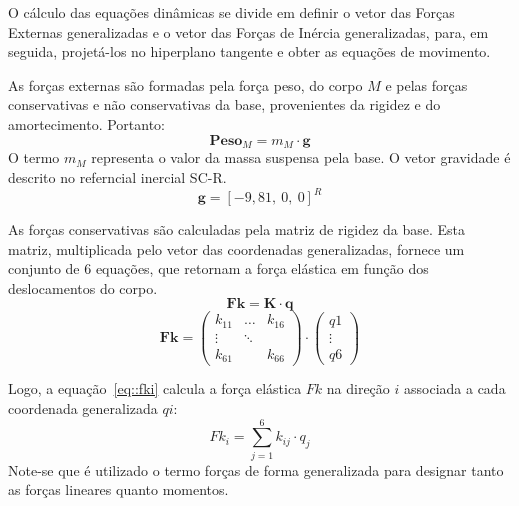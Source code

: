 O cálculo das equações dinâmicas se divide em definir o vetor das Forças
Externas generalizadas e o vetor das Forças de Inércia generalizadas, para, em
seguida, projetá-los no hiperplano tangente e obter as equações de movimento.

As forças externas são formadas pela força peso, do corpo $M$ e
pelas forças conservativas e não conservativas da base, provenientes da rigidez
e do amortecimento. Portanto:
%
\begin{equation}
	\mathbf{Peso}_M = m_M \cdot \mathbf{g}
\end{equation}
%
O termo $m_M$ representa o valor da massa suspensa pela base. O vetor
gravidade é descrito no referncial inercial SC-R.
%
\begin{equation}
	\mathbf{g} = [-9,81,~0,~0]^{R}
\end{equation}
%


As forças conservativas são calculadas pela matriz de rigidez da base. Esta
matriz, multiplicada pelo vetor das coordenadas generalizadas, fornece um
conjunto de 6 equações, que retornam a força elástica em função dos
deslocamentos do corpo.
%
\begin{equation}
	\mathbf{Fk} = \mathbf{K} \cdot \mathbf{q}
\end{equation}
\begin{equation}
	\mathbf{Fk} = \begin{pmatrix} 
    k_{11} & \dots 	& k_{16} \\
    \vdots & \ddots & \\
    k_{61} &        & k_{66} 
    \end{pmatrix} \cdot 
    \begin{pmatrix} 
    q1 \\ 
    \vdots \\ 
    q6 
    \end{pmatrix}
\end{equation}


Logo, a equação~\ref{eq::fki} calcula a força elástica $Fk$ na direção $i$
associada a cada coordenada generalizada $qi$:
%
\begin{equation} \label{eq::fki}
	Fk_i = \sum_{j=1}^{6} k_{ij} \cdot q_j
\end{equation}
%
Note-se que é utilizado o termo forças de forma generalizada para designar tanto
as forças lineares quanto momentos.

